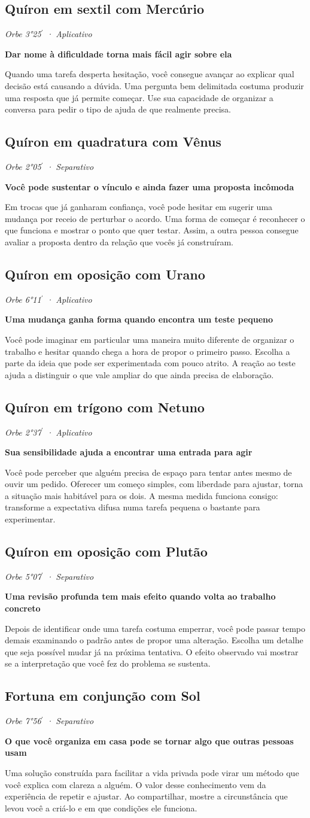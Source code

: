 \documentclass[11pt,a4paper]{article}
\newcommand{\leitura}[3]{\subsection{#1}\textit{#2}\par #3}
\newcommand{\subtituloleitura}[1]{\textbf{#1}\par\nopagebreak[4]}
\begin{document}
\leitura{Quíron em sextil com Mercúrio}{Orbe 3°25\ensuremath{^{\prime}} · Aplicativo}{
\subtituloleitura{Dar nome à dificuldade torna mais fácil agir sobre ela}
Quando uma tarefa desperta hesitação, você consegue avançar ao explicar qual decisão está causando a dúvida. Uma pergunta bem delimitada costuma produzir uma resposta que já permite começar. Use sua capacidade de organizar a conversa para pedir o tipo de ajuda de que realmente precisa.
}

\leitura{Quíron em quadratura com Vênus}{Orbe 2°05\ensuremath{^{\prime}} · Separativo}{
\subtituloleitura{Você pode sustentar o vínculo e ainda fazer uma proposta incômoda}
Em trocas que já ganharam confiança, você pode hesitar em sugerir uma mudança por receio de perturbar o acordo. Uma forma de começar é reconhecer o que funciona e mostrar o ponto que quer testar. Assim, a outra pessoa consegue avaliar a proposta dentro da relação que vocês já construíram.
}

\leitura{Quíron em oposição com Urano}{Orbe 6°11\ensuremath{^{\prime}} · Aplicativo}{
\subtituloleitura{Uma mudança ganha forma quando encontra um teste pequeno}
Você pode imaginar em particular uma maneira muito diferente de organizar o trabalho e hesitar quando chega a hora de propor o primeiro passo. Escolha a parte da ideia que pode ser experimentada com pouco atrito. A reação ao teste ajuda a distinguir o que vale ampliar do que ainda precisa de elaboração.
}

\leitura{Quíron em trígono com Netuno}{Orbe 2°37\ensuremath{^{\prime}} · Aplicativo}{
\subtituloleitura{Sua sensibilidade ajuda a encontrar uma entrada para agir}
Você pode perceber que alguém precisa de espaço para tentar antes mesmo de ouvir um pedido. Oferecer um começo simples, com liberdade para ajustar, torna a situação mais habitável para os dois. A mesma medida funciona consigo: transforme a expectativa difusa numa tarefa pequena o bastante para experimentar.
}

\leitura{Quíron em oposição com Plutão}{Orbe 5°07\ensuremath{^{\prime}} · Separativo}{
\subtituloleitura{Uma revisão profunda tem mais efeito quando volta ao trabalho concreto}
Depois de identificar onde uma tarefa costuma emperrar, você pode passar tempo demais examinando o padrão antes de propor uma alteração. Escolha um detalhe que seja possível mudar já na próxima tentativa. O efeito observado vai mostrar se a interpretação que você fez do problema se sustenta.
}

\leitura{Fortuna em conjunção com Sol}{Orbe 7°56\ensuremath{^{\prime}} · Separativo}{
\subtituloleitura{O que você organiza em casa pode se tornar algo que outras pessoas usam}
Uma solução construída para facilitar a vida privada pode virar um método que você explica com clareza a alguém. O valor desse conhecimento vem da experiência de repetir e ajustar. Ao compartilhar, mostre a circunstância que levou você a criá-lo e em que condições ele funciona.
}
\end{document}
